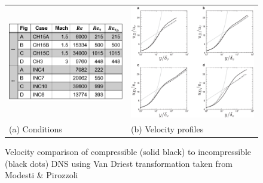 \begin{figure}[h]
  \centering
  \setlength{\abovecaptionskip}{20pt}

  \begin{tabular}{
    >{\centering\arraybackslash}m{}  @{\quad}
    >{\centering\arraybackslash}m{}
    }
    \includegraphics[width=\linewidth]{images/van-driest-mean-table.png}
     &
    \includegraphics[width=\linewidth]{images/van-driest-incomp-compare1.png}
    \\[1ex]
    (a) Conditions
     &
    (b) Velocity profiles
  \end{tabular}

  \caption{\label{fig:v-vd}
    Velocity comparison of compressible (solid black) to incompressible (black dots) DNS
    using Van Driest transformation taken from Modesti \& Pirozzoli \cite{modestiReynoldsMachNumber2016}}
\end{figure}



